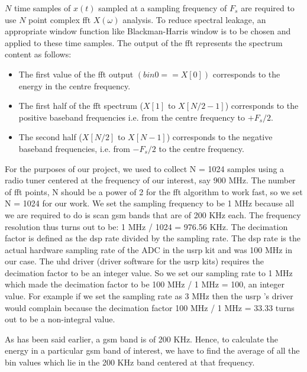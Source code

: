 $N$ time samples of $x(t)$ sampled at a sampling frequency of $F_{s}$ are 
required to use $N$ point complex \gls{fft}  $X(\omega)$ analysis. To reduce spectral
leakage, an appropriate window function like Blackman-Harris window is to be 
chosen  and applied to these time samples. The output of the \gls{fft}  represents 
the spectrum content as follows:

\begin{itemize}
    \item The first value of the \gls{fft}  output $(bin0 == X[0])$ corresponds to 
    the energy in the centre frequency.
    \item The first half of the \gls{fft}  spectrum ($X[1]$ to $X[N/2-1]$) 
    corresponds to the positive baseband frequencies i.e. from the centre 
    frequency to $+F_{s}/2$.
    \item The second half ($X[N/2]$ to $X[N-1]$) corresponds to the negative 
    baseband frequencies, i.e. from $-F_{s}/2$ to the centre frequency.
\end{itemize}


For the purposes of our project, we used to collect N = 1024 samples using a 
radio tuner centered at the frequency of our interest, say 900 MHz. The number
of \gls{fft}  points, N should be a power of 2 for the \gls{fft}  algorithm to work fast, so
we set N = 1024 for our work. We set the sampling frequency to be 1 MHz 
because all we are required to do is scan \gls{gsm} bands that are of 200 KHz each. 
The frequency resolution thus turns out to be: 1 MHz / 1024 = 976.56 KHz. The 
decimation factor is defined as the dsp rate divided by the sampling rate. The
dsp rate is the actual hardware sampling rate of the ADC in the \gls{usrp}  kit and 
was 100 MHz in our case. The \gls{uhd}  driver (driver software for the \gls{usrp}  kits)
requires the decimation factor to be an integer value. So we set our sampling 
rate to 1 MHz which made the decimation factor to be 100 MHz / 1 MHz = 100, an
integer value. For example if we set the sampling rate as 3 MHz then the 
\gls{usrp} 's driver would complain because the decimation factor 100 MHz / 1 MHz = 
33.33 turns out to be a non-integral value.

As has been said earlier, a \gls{gsm} band is of 200 KHz. Hence, to calculate the 
energy in a particular \gls{gsm} band of interest, we have to find the average of 
all the bin values which lie in the 200 KHz band centered at that frequency.


